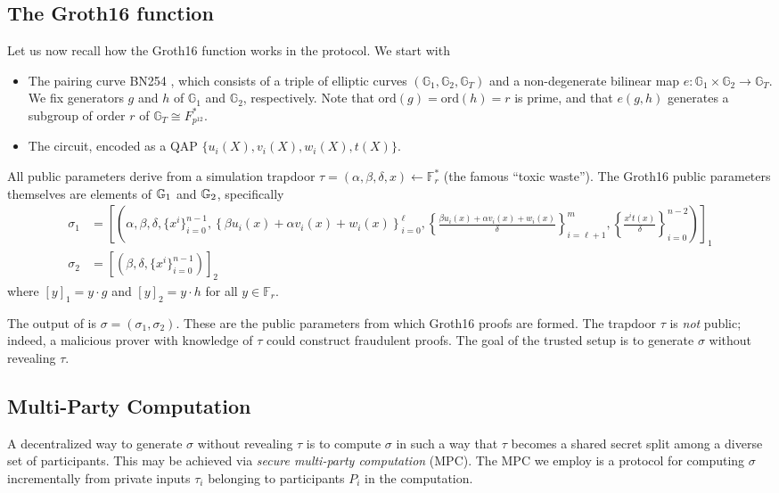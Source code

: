\subsection{The Groth16 \Setup{} function}
Let us now recall how the Groth16 \Setup{} function works in the \MantaPay{} protocol. We start with 
\begin{itemize}
\item The pairing curve BN254 \cite{BN254}, which consists of a triple of elliptic curves $(\mathbb{G}_1, \mathbb{G}_2,\mathbb{G}_T) $ and a non-degenerate bilinear map $e: \mathbb{G}_1 \times \mathbb{G}_2 \to \mathbb{G}_T$. We fix generators $g$ and $h$ of $\mathbb{G}_1$ and $\mathbb{G}_2$, respectively. Note that $\textrm{ord}(g) = \textrm{ord}(h) = r$ is prime, and that $e(g,h)$ generates a subgroup of order $r$ of $\mathbb{G}_T \cong F_{p^{12}}^*$.
\item The \MantaPay{} circuit, encoded as a QAP $\{u_i(X), v_i(X), w_i(X), t(X)\}$.
\end{itemize}
All public parameters derive from a simulation trapdoor $\tau = (\alpha, \beta, \delta, x) \leftarrow \mathbb{F}_r^*$ (the famous ``toxic waste''). The Groth16 public parameters themselves are elements of $\mathbb{G}_1$ and $\mathbb{G}_2$, specifically
\begin{align}\label{eq: prover_key} %
\sigma_1 &= \left[ \left(\alpha, \beta, \delta, \{ x^i \}_{i=0}^{n-1},\left\{  \beta u_i(x) + \alpha v_i(x) + w_i(x) \right\}_{i=0}^\ell, \left\{  \frac{\beta u_i(x) + \alpha v_i(x) + w_i(x)}{\delta} \right\}_{i=\ell+1}^m, \left\{ \frac{x^i t(x)}{\delta} \right\}_{i=0}^{n-2} \right) \right]_1 \\
\sigma_2 &= \left[ \left( \beta, \delta,  \{ x^i \}_{i=0}^{n-1} \right) \right]_2
\end{align} 
where $[y]_1 = y \cdot g$ and $[y]_2 = y \cdot h$ for all $y \in \mathbb{F}_r$. 

The output of \Setup{} is $\sigma = (\sigma_1, \sigma_2)$. These are the public parameters from which Groth16 proofs are formed. The trapdoor $\tau$ is \emph{not} public; indeed, a malicious prover with knowledge of $\tau$ could construct fraudulent proofs. The goal of the trusted setup is to generate $\sigma$ without revealing $\tau$.

\subsection{Multi-Party Computation}
A decentralized way to generate $\sigma$ without revealing $\tau$ is to compute $\sigma$ in such a way that $\tau$ becomes a shared secret split among a diverse set of participants. This may be achieved via \emph{secure multi-party computation} (MPC). The MPC we employ is a protocol for computing $\sigma$ incrementally from private inputs $\tau_i$ belonging to participants $P_i$ in the computation. 

